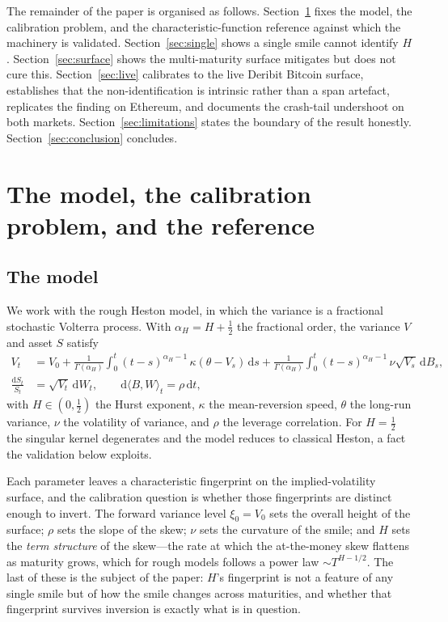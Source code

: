 \documentclass[11pt,a4paper]{article}
\numberwithin{equation}{section}
\begin{document}
The remainder of the paper is organised as follows.
Section~\ref{sec:setup} fixes the model, the calibration problem, and the
characteristic-function reference against which the machinery is validated.
Section~\ref{sec:single} shows a single smile cannot identify $H$.
Section~\ref{sec:surface} shows the multi-maturity surface mitigates but does not cure this.
Section~\ref{sec:live} calibrates to the live Deribit Bitcoin surface, establishes that the
non-identification is intrinsic rather than a span artefact, replicates the finding on
Ethereum, and documents the crash-tail undershoot on both markets.
Section~\ref{sec:limitations} states the boundary of the result honestly.
Section~\ref{sec:conclusion} concludes.

\section{The model, the calibration problem, and the reference}\label{sec:setup}

\subsection{The model}

We work with the rough Heston model, in which the variance is a fractional stochastic
Volterra process. With $\alpha_{\!H}=H+\tfrac12$ the fractional order, the variance $V$ and
asset $S$ satisfy
\begin{align}
V_t &= V_0 + \frac{1}{\Gamma(\alpha_{\!H})}\int_0^t (t-s)^{\alpha_{\!H}-1}\,
       \kappa(\theta - V_s)\,\mathrm{d}s
     + \frac{1}{\Gamma(\alpha_{\!H})}\int_0^t (t-s)^{\alpha_{\!H}-1}\,
       \nu\sqrt{V_s}\,\mathrm{d}B_s, \\
\frac{\mathrm{d}S_t}{S_t} &= \sqrt{V_t}\,\mathrm{d}W_t,
\qquad \mathrm{d}\langle B,W\rangle_t = \rho\,\mathrm{d}t,
\end{align}
with $H\in(0,\tfrac12)$ the Hurst exponent, $\kappa$ the mean-reversion speed, $\theta$ the
long-run variance, $\nu$ the volatility of variance, and $\rho$ the leverage correlation.
For $H=\tfrac12$ the singular kernel degenerates and the model reduces to classical Heston, a
fact the validation below exploits.

Each parameter leaves a characteristic fingerprint on the implied-volatility surface, and the
calibration question is whether those fingerprints are distinct enough to invert. The forward
variance level $\xi_0=V_0$ sets the overall height of the surface; $\rho$ sets the slope of the
skew; $\nu$ sets the curvature of the smile; and $H$ sets the \emph{term structure} of the
skew---the rate at which the at-the-money skew flattens as maturity grows, which for rough
models follows a power law $\sim T^{H-1/2}$. The last of these is the subject of the paper:
$H$'s fingerprint is not a feature of any single smile but of how the smile changes across
maturities, and whether that fingerprint survives inversion is exactly what is in question.
\end{document}
